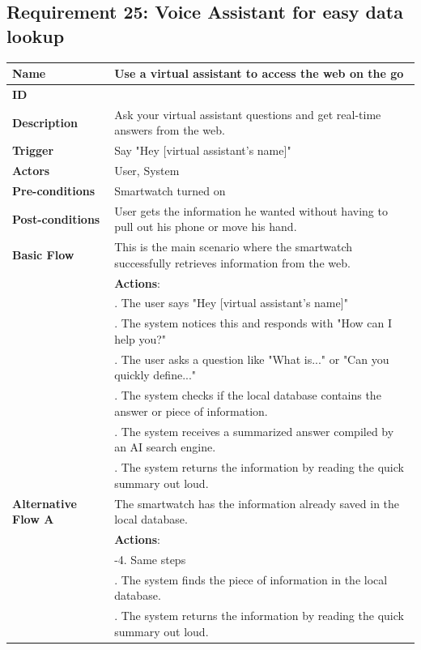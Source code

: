\documentclass{article}
\begin{document}
	\subsection{Requirement 25: Voice Assistant for easy data lookup}
	\vspace{1em}
	\begin{center}
		\small
		\begin{tabularx}{1.0\textwidth}{|>{\raggedright\arraybackslash}p{}|>{\raggedright\arraybackslash}X|}
			\hline
			\textbf{Name}               & Use a virtual assistant to access the web on the go \\ \hline
			\textbf{ID}                 & 25 \\ \hline
			\textbf{Description}        & Ask your virtual assistant questions and get real-time answers from the web. \\ \hline
			\textbf{Trigger}            & Say "Hey [virtual assistant's name]" \\ \hline
			\textbf{Actors}             & User, System \\ \hline
			\textbf{Pre-conditions}     & Smartwatch turned on \\ \hline
			\textbf{Post-conditions}    & User gets the information he wanted without having to pull out his phone or move his hand. \\ \hline
			\textbf{Basic Flow}         & This is the main scenario where the smartwatch successfully retrieves information from the web. \\ \hline
										& \textbf{Actions}: \\ 
										& 1. The user says "Hey [virtual assistant's name]" \\ 
										& 2. The system notices this and responds with "How can I help you?" \\ 
										& 3. The user asks a question like "What is..." or "Can you quickly define..." \\ 
										& 4. The system checks if the local database contains the answer or piece of information. \\ 
										& 5. The system receives a summarized answer compiled by an AI search engine. \\ 
										& 6. The system returns the information by reading the quick summary out loud. \\ \hline
			\textbf{Alternative Flow A} & The smartwatch has the information already saved in the local database. \\ \hline
										& \textbf{Actions}: \\ 
										& 1-4. Same steps \\ 
										& 5. The system finds the piece of information in the local database. \\ 
										& 6. The system returns the information by reading the quick summary out loud. \\ \hline
		\end{tabularx}
		\end{center}
\end{document}
